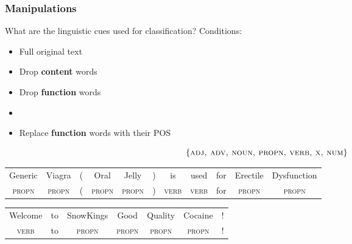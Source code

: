 \documentclass[t,xcolor={svgnames,table}]{beamer}
\begin{document}
\begin{frame}
	\frametitle{Manipulations}
	
	What are the linguistic cues used for classification?
	\pause
	Conditions:
	\vfill
	
	\begin{itemize}\setlength\itemsep{1em}
	    \item Full original text
	\end{itemize}
	\vspace{1em}
	
	\begin{minipage}{.35\textwidth}
	\begin{itemize}\setlength\itemsep{1em}
		\item Drop \textbf{content} words
		\item Drop \textbf{function} words
	\end{itemize}
	\end{minipage}
	\begin{minipage}{.59\textwidth}
	\begin{itemize}\setlength\itemsep{1em}
		\item {}
		\item Replace \textbf{function} words with their POS
	\end{itemize}
	\end{minipage}
	\vfill
	
    \[\{\textsc{adj, adv, noun, propn, verb, x, num}\}\]
	\vfill
	\pause
	
	{\color{green}
	\setlength{\tabcolsep}{2.3pt}
	\begin{tabular}{ccccccccccc}
	Generic&Viagra&(&Oral&Jelly&)&is&used&for&Erectile&Dysfunction\\
	\small\textsc{propn} & \small\textsc{propn} &(& \small\textsc{propn} & \small\textsc{propn} &)& \small\textsc{verb} & \small\textsc{verb} & for & \small\textsc{propn} & \small\textsc{propn}
	\end{tabular}}
	\vfill
	\pause
	
	{\color{red}
	\setlength{\tabcolsep}{9.5pt}
	\begin{tabular}{ccccccc}
	Welcome&to&SnowKings&Good&Quality&Cocaine&!\\
	\small\textsc{verb} & to & \small\textsc{propn} & \small\textsc{propn} & \small\textsc{propn} & \small\textsc{propn} & !
	\end{tabular}}
\end{frame}
\end{document}
